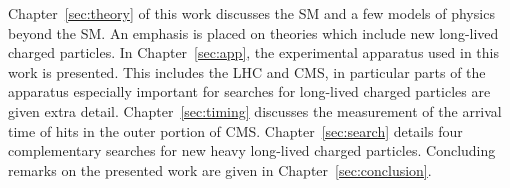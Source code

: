 Chapter~\ref{sec:theory} of this work discusses the SM and a few models of physics beyond the SM. 
An emphasis is placed on theories which include new long-lived charged particles.
In Chapter~\ref{sec:app}, the experimental apparatus used in this work is presented. This includes the LHC and 
CMS, in particular parts of the apparatus especially important
for searches for long-lived charged particles are given extra detail.
Chapter~\ref{sec:timing} discusses the measurement of the arrival time of hits in the outer portion of CMS.
Chapter~\ref{sec:search} details four complementary searches for new heavy long-lived charged particles.
Concluding remarks on the presented work are given in Chapter~\ref{sec:conclusion}.
